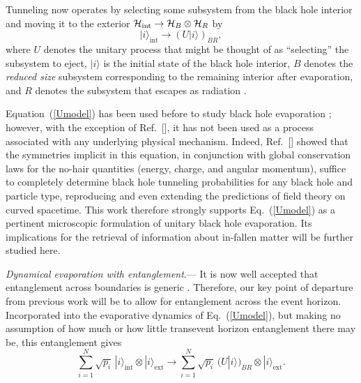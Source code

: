 \documentclass[twocolumn,aps,showpacs,prl]{revtex4}
\begin{document}
Tunneling now operates \cite{B10} by selecting some subsystem from
the black hole interior and moving it to the exterior
${\cal H}_{\text{int}}\rightarrow{\cal H}_B\otimes {\cal H}_R$ by
\begin{equation}
|i\rangle_{\text{int}}\rightarrow (U|i\rangle)_{BR}, \label{Umodel}
\end{equation}
where $U$ denotes the unitary process that might be thought of as
``selecting'' the subsystem to eject, $|i\rangle$ is the initial
state of the black hole interior, $B$ denotes the {\it reduced size\/}
subsystem corresponding to the remaining interior after evaporation,
and $R$ denotes the subsystem that escapes as
radiation \cite{B10,Page93,Hayden07}.

Equation~(\ref{Umodel}) has been used before to study black hole
evaporation \cite{B10,Page93,Hayden07}; however, with the exception
of Ref.~[], it has not been used as a process
associated with any
underlying physical mechanism. Indeed, Ref.~[] showed that
the symmetries implicit in this equation, in conjunction with global 
conservation laws for the no-hair quantities (energy, charge, and 
angular momentum), suffice to completely determine black hole tunneling 
probabilities for any black hole and particle type, reproducing and 
even extending the predictions of field theory on curved spacetime. 
This work therefore strongly supports Eq.~(\ref{Umodel}) as a pertinent
microscopic formulation of unitary black hole evaporation. Its
implications for the retrieval of information about in-fallen
matter will be further studied here.

{\it Dynamical evaporation with entanglement}.---%
It is now well accepted that entanglement across boundaries is
generic \cite{Eisert09}. Therefore, our key point of departure from
previous work \cite{B10,Page93,Hayden07,Smolin,me} will be to allow for
entanglement across the event horizon. Incorporated into the evaporative
dynamics of Eq.~(\ref{Umodel}), but making no assumption of how much or
how little transevent horizon entanglement there may be, this
entanglement gives
\begin{equation}
\sum_{i=1}^N\sqrt{p_i}\, |i\rangle_{\text{int}}\otimes|i\rangle_{\text{ext}}
\rightarrow \sum_{i=1}^N \sqrt{p_i}\, (U|i\rangle)_{{BR}}\otimes
|i\rangle_{\text{ext}}.
\label{entUmodel}
\end{equation}
\end{document}
